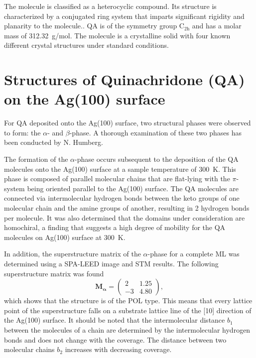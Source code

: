 The molecule is classified as a heterocyclic compound. Its structure is characterized by a conjugated ring system that imparts significant rigidity and planarity to the molecule.\autocite{forBiotechnologyInformation2025}. \ac{QA} is of the symmetry group $\mathrm{C_{2h}}$ and has a molar mass of 312.32~\si{g/mol}. The molecule is a crystalline solid with four known different crystal structures under standard conditions.\autocite{Paulus2007,Mizuguchi}


\section{Structures of Quinachridone (QA) on the Ag(100) surface}

For \ac{QA} deposited onto the Ag(100) surface, two structural phases were observed to form: the $\alpha$- and $\beta$-phase. A thorough examination of these two phases has been conducted by N. Humberg.\autocite{Humberg2024, Humberg2020}

The formation of the $\alpha$-phase occurs subsequent to the deposition of the \ac{QA} molecules onto the Ag(100) surface at a sample temperature of 300~\si{K}. This phase is composed of parallel molecular chains that are flat-lying with the $\pi$-system being oriented parallel to the Ag(100) surface. The \ac{QA} molecules are connected via intermolecular hydrogen bonds between the keto groups of one molecular chain and the amine groups of another, resulting in 2 hydrogen bonds per molecule. It was also determined that the domains under consideration are homochiral, a finding that suggests a high degree of mobility for the \ac{QA} molecules on Ag(100) surface at 300~\si{K}.

In addition, the superstructure matrix of the $\alpha$-phase for a complete \ac{ML} was determined using a \ac{SPA-LEED} image and \ac{STM} results. The following superstructure matrix was found
\begin{equation*}
\mathbf{M_\alpha} =\begin{pmatrix}
2 & 1.25 \\
-3 & 4.80 
\end{pmatrix},
\end{equation*}
which shows that the structure is of the \ac{POL} type. This means that every lattice point of the superstructure falls on a substrate lattice line of the [10] direction of the Ag(100) surface. It should be noted that the intermolecular distance $b_1$ between the molecules of a chain are determined by the intermolecular hydrogen bonds and does not change with the coverage. The distance between two molecular chains $b_2$ increases with decreasing coverage.

